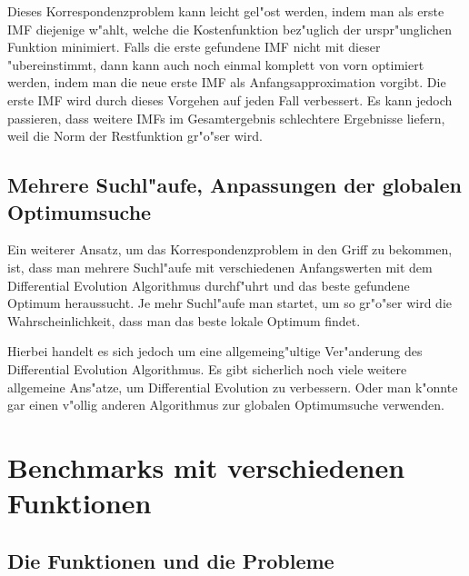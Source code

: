 \documentclass[a4paper]{scrartcl}
\begin{document}
Dieses Korrespondenzproblem kann leicht gel"ost werden, indem man als erste IMF diejenige w"ahlt, welche die Kostenfunktion bez"uglich der urspr"unglichen Funktion minimiert. 
Falls die erste gefundene IMF nicht mit dieser "ubereinstimmt, dann kann auch noch einmal komplett von vorn optimiert werden, indem man die neue erste IMF als Anfangsapproximation vorgibt. 
Die erste IMF wird durch dieses Vorgehen auf jeden Fall verbessert. 
Es kann jedoch passieren, dass weitere IMFs im Gesamtergebnis schlechtere Ergebnisse liefern, weil die Norm der Restfunktion gr"o"ser wird.


\subsection{Mehrere Suchl"aufe, Anpassungen der globalen Optimumsuche} \label{sec:aormchsogz}

Ein weiterer Ansatz, um das Korrespondenzproblem in den Griff zu bekommen, ist, dass man mehrere Suchl"aufe mit verschiedenen Anfangswerten mit dem Differential Evolution Algorithmus durchf"uhrt und das beste gefundene Optimum heraussucht. 
Je mehr Suchl"aufe man startet, um so gr"o"ser wird die Wahrscheinlichkeit, dass man das beste lokale Optimum findet. 

Hierbei handelt es sich jedoch um eine allgemeing"ultige Ver"anderung des Differential Evolution Algorithmus. 
Es gibt sicherlich noch viele weitere allgemeine Ans"atze, um Differential Evolution zu verbessern. 
Oder man k"onnte gar einen v"ollig anderen Algorithmus zur globalen Optimumsuche verwenden. 


\section{Benchmarks mit verschiedenen Funktionen}

\subsection{Die Funktionen und die Probleme}
\end{document}
